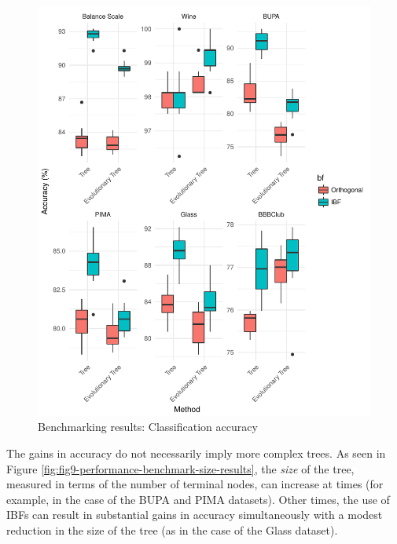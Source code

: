 \documentclass[]{elsarticle} %
\makeatletter
\def\maxwidth{\ifdim\Gin@nat@width>\linewidth\linewidth
\else\Gin@nat@width\fi}
\let\Oldincludegraphics\includegraphics
\renewcommand{\includegraphics}[1]{\Oldincludegraphics[width=\maxwidth]{#1}}
\makeatother
\begin{document}
\begin{figure}[htbp]
\centering
\includegraphics{Trees_with_Base_Functions_files/figure-latex/fig8-performance-benchmark-train-results-1.pdf}
\caption{\label{fig:fig8-performance-benchmark-results-train}Benchmarking
results: Classification accuracy}
\end{figure}

The gains in accuracy do not necessarily imply more complex trees. As
seen in Figure \ref{fig:fig9-performance-benchmark-size-results}, the
\emph{size} of the tree, measured in terms of the number of terminal
nodes, can increase at times (for example, in the case of the BUPA and
PIMA datasets). Other times, the use of IBFs can result in substantial
gains in accuracy simultaneously with a modest reduction in the size of
the tree (as in the case of the Glass dataset).
\end{document}
